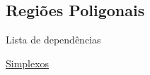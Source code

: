 \subsection{Regiões Poligonais}
\label{regiao-poligonal-def}
\begin{titlemize}{Lista de dependências}
	\item \hyperref[simplexo-def]{Simplexos}%
\end{titlemize}
